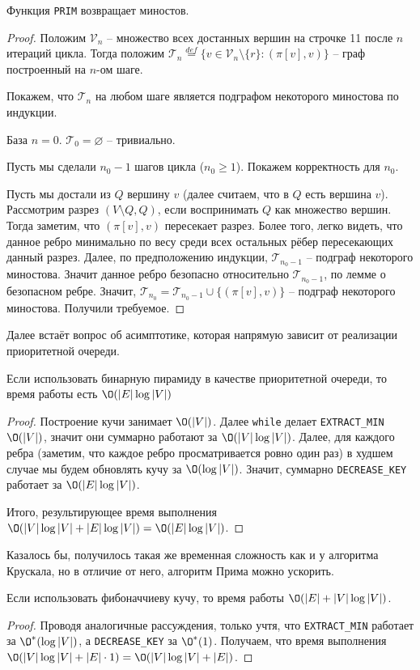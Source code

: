 \St Функция \texttt{PRIM} возвращает миностов.
\begin{proof}

    Положим $\mathcal{V}_n$ -- множество всех достанных вершин на строчке 11 после $n$ итераций цикла. 
    Тогда положим $\mathcal{T}_n \overset{def}{=} \{ v \in \mathcal{V}_n \setminus \{ r \}:  (\pi[v], v) \}$ -- граф построенный на $n$-ом шаге.

    Покажем, что $\mathcal{T}_n$ на любом шаге является подграфом некоторого миностова по индукции.

    База $n = 0$. $\mathcal{T}_0 = \varnothing$ -- тривиально.
    
    Пусть мы сделали $n_0 - 1$ шагов цикла ($n_0 \geq 1$). Покажем корректность для $n_0$.

    Пусть мы достали из $Q$ вершину $v$ (далее считаем, что в $Q$ есть вершина $v$). 
    Рассмотрим разрез $(V \setminus Q, Q)$, если воспринимать $Q$ как множество вершин.
    Тогда заметим, что $(\pi[v], v)$ пересекает разрез.
    Более того, легко видеть, что данное ребро минимально по весу среди всех остальных рёбер пересекающих данный разрез.
    Далее, по предположению индукции, $\mathcal{T}_{n_0 - 1}$ -- подграф некоторого миностова.
    Значит данное ребро безопасно относительно $\mathcal{T}_{n_0 - 1}$, по лемме о безопасном ребре. 
    Значит, $\mathcal{T}_{n_0} = \mathcal{T}_{n_0 - 1} \cup \{(\pi[v], v)\}$ -- подграф некоторого миностова. Получили требуемое.

\end{proof}

Далее встаёт вопрос об асимптотике, которая напрямую зависит от реализации приоритетной очереди.

\St Если использовать бинарную пирамиду в качестве приоритетной очереди, то время работы есть $\O(|E| \log |V|)$
\begin{proof}
    
    Построение кучи занимает $\O(|V|)$. Далее \texttt{while} делает \texttt{EXTRACT\_MIN} $\O(|V|)$, значит они суммарно работают за $\O(|V| \log |V|)$.
    Далее, для каждого ребра (заметим, что каждое ребро просматривается ровно один раз) в худшем случае мы будем обновлять кучу за $\O(\log |V|)$.
    Значит, суммарно \texttt{DECREASE\_KEY} работает за $\O(|E| \log |V|)$.

    Итого, результирующее время выполнения $\O(|V| \log |V| + |E| \log |V|) = \O(|E| \log |V|)$.
    
\end{proof}

Казалось бы, получилось такая же временная сложность как и у алгоритма Крускала, но в отличие от него, алгоритм Прима можно ускорить.

\StBd Если использовать фибоначчиеву кучу, то время работы $\O(|E| + |V| \log |V|)$.

\begin{proof}

    Проводя аналогичные рассуждения, только учтя, что \texttt{EXTRACT\_MIN} работает за $\O^*(\log |V|)$, а \texttt{DECREASE\_KEY} за $\O^*(1)$.
    Получаем, что время выполнения $\O(|V| \log |V| + |E| \cdot 1) = \O(|V| \log |V| + |E|)$.

\end{proof}